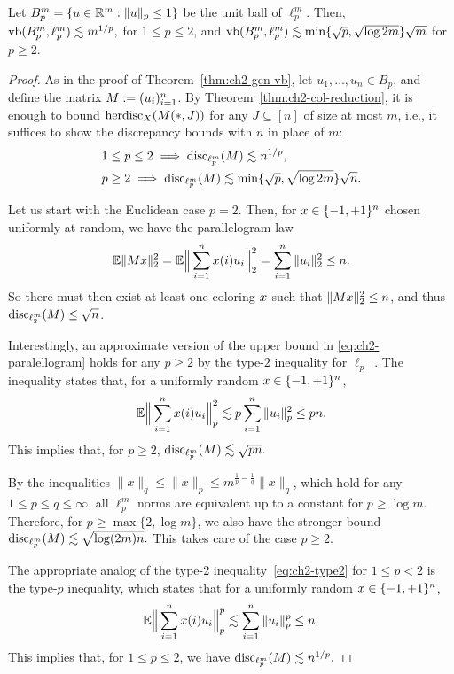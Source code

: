 \begin{theorem}\label{thm:ch2-ellp-vb}
  Let
  \(B_p^m =\{u\in\mathbb{R}^m:\|u\|_p\le 1\}\) be the unit ball of 
  \(\ell_p^m\). 
  Then,  \(\operatorname{vb}(B_p^m, \ell_p^m) \lesssim m^{1/p},\) for \(1 \le p \le 2\),
  and  \(\operatorname{vb}(B_p^m, \ell_p^m) \lesssim
  \min\{\sqrt{p},\sqrt{\log 2m}\}\sqrt{m}\) for \(p \ge 2\).
\end{theorem}
\begin{proof}
  As in the proof of Theorem~\ref{thm:ch2-gen-vb}, let \(u_1, \ldots,
  u_n \in B_p\), and define the matrix \(M := (u_i)_{i =    1}^n\). 
  By Theorem~\ref{thm:ch2-col-reduction}, it is enough to bound
  \(\operatorname{herdisc}_X(M(*,J))\) for any \(J\subseteq [n]\) of size at most
  \(m\), i.e., it suffices to show the discrepancy bounds
  with \(n\) in place of \(m\):
  \begin{align}
    &1 \le p \le 2 \implies \operatorname{disc}_{\ell_p^m}(M) \lesssim n^{1/p},\\
    &p \ge 2 \implies \operatorname{disc}_{\ell_p^m}(M) \lesssim \min\{\sqrt{p},\sqrt{\log 2m}\}\sqrt{n}.
  \end{align}

  Let us start with the Euclidean case \(p=2\). Then, for \(x \in \{-1,+1\}^n\)
  chosen uniformly at random, we have the parallelogram law
  \begin{equation}\label{eq:ch2-paralellogram}
    \mathbb{E}\|M x\|_2^2 = 
    \mathbb{E} \Big\|\sum_{i = 1}^n x(i)u_i\Big\|_2^2 = \sum_{i = 1}^n
    \|u_i\|_2^2 \le n.
  \end{equation}
  So there must then exist at least one coloring \(x\) such that
  \(\|M x\|_2^2 \le n\), and thus \(\operatorname{disc}_{\ell_2^m}(M) \le
  \sqrt{n}\).

  Interestingly, an approximate version of the upper bound in
  \eqref{eq:ch2-paralellogram} holds for any \(p \ge 2\) by the
  type-\(2\) inequality for \(\ell_p\)~\cite[Chapter
  9]{LedouxTalagrand91}. The inequality states that, for a uniformly
  random \(x \in \{-1,+1\}^n\),
  \begin{equation}\label{eq:ch2-type2}
    \mathbb{E} \Big\|\sum_{i = 1}^n x(i)u_i\Big\|_p^2 \lesssim {p} \sum_{i = 1}^n
    \|u_i\|_p^2 \le p n.
  \end{equation}
  This implies that, for \(p \ge 2\),
  \(
  \operatorname{disc}_{\ell_p^m}(M) \lesssim \sqrt{pn}.
  \)
  
  By the inequalities \(\|x\|_q \le \|x\|_p \le m^{\frac1p -
    \frac1q} \|x\|_q\), which hold for any \(1 \le p \le q \le \infty\), all \(\ell_p^m\) norms are equivalent up to a constant
  for \(p \ge \log m\). Therefore, for \(p \ge \max\{2,\log
  m\}\), we also have the stronger bound
  \(
  \operatorname{disc}_{\ell_p^m}(M) \lesssim \sqrt{\log(2m) n}.
  \)
  This takes care of the case \(p \ge 2\).
  
  
  The appropriate analog of the type-2 inequality~\eqref{eq:ch2-type2} for \(1 \le p < 2\) is the type-\(p\) inequality, which states
  that for a uniformly random \(x \in \{-1,+1\}^n\),
  \[
    \mathbb{E} \Big\|\sum_{i = 1}^n x(i)u_i\Big\|_p^p \lesssim \sum_{i = 1}^n
    \|u_i\|_p^p \le n.
  \]
  This implies that, for \(1 \le p \le 2\), we have 
  \(
  \operatorname{disc}_{\ell_p^m}(M) \lesssim n^{1/p}.
  \)
\end{proof}

